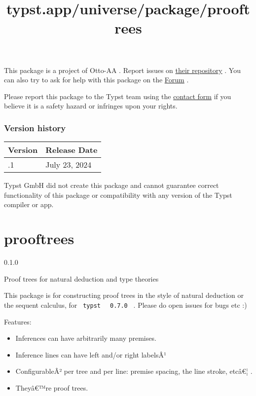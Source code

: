 This package is a project of Otto-AA . Report issues on
\href{https://github.com/Otto-AA/dashy-todo}{their repository} . You can
also try to ask for help with this package on the
\href{https://forum.typst.app}{Forum} .

Please report this package to the Typst team using the
\href{https://typst.app/contact}{contact form} if you believe it is a
safety hazard or infringes upon your rights.

\label{versions}
\subsubsection{Version history}\label{version-history}

\begin{longtable}[]{@{}ll@{}}
\toprule\noalign{}
Version & Release Date \\
\midrule\noalign{}
\endhead
\bottomrule\noalign{}
\endlastfoot
0.0.1 & July 23, 2024 \\
\end{longtable}

Typst GmbH did not create this package and cannot guarantee correct
functionality of this package or compatibility with any version of the
Typst compiler or app.


\title{typst.app/universe/package/prooftrees}

\label{banner}
\section{prooftrees}\label{prooftrees}

{ 0.1.0 }

Proof trees for natural deduction and type theories

\label{readme}
This package is for constructing proof trees in the style of natural
deduction or the sequent calculus, for \texttt{\ typst\ }
\texttt{\ 0.7.0\ } . Please do open issues for bugs etc :)

Features:

\begin{itemize}
\tightlist
\item
  Inferences can have arbitrarily many premises.
\item
  Inference lines can have left and/or right labelsÂ¹
\item
  ConfigurableÂ² per tree and per line: premise spacing, the line
  stroke, etcâ€¦ .
\item
  Theyâ€™re proof trees.
\end{itemize}

